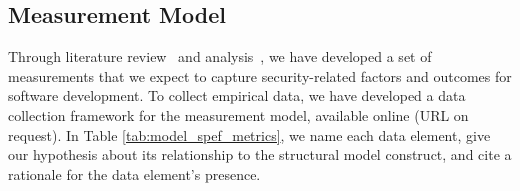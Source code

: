 
\subsection{Measurement Model}
\label{sec:model_measurement}
Through literature review~\cite{morrison2014mapping} and analysis~\cite{morrison2017surveying,morrison2017measuring}, we have developed a set of measurements that we expect to capture security-related factors and outcomes for software development. To collect empirical data, we have developed a data collection framework for the measurement model, available online (URL on request). In Table \ref{tab:model_spef_metrics}, we name each data element, give our hypothesis about its relationship to the structural model construct, and cite a rationale for the data element's presence. 
		
